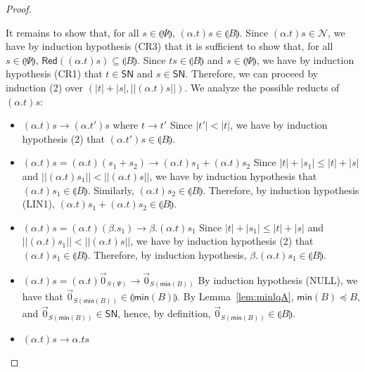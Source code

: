 \documentclass[preprint]{elsarticle}
\newcommand\interp[1]{\llparenthesis #1\rrparenthesis}
\newcommand\size[1]{||#1||}
\newcommand\Red[1]{\mathsf{Red}(#1)}
\newcommand\SN{\mathsf{SN}}
\newcommand\lpl[1]{|#1|}
\newcommand\z[1][A]{\vec 0_{S(#1)}}
\newcommand\nullvec[1]{\z[#1]}
\newcommand{\app}[2]{#1 #2}
\newcommand{\reducesto}{\rightarrow}
\begin{document}
\begin{proof}
\begin{itemize}
\begin{description}
         It remains to show that, for all \( s \in \interp{\Psi} \), \( \app{(\alpha . t)}{s} \in \interp{B} \). Since \( \app{(\alpha . t)}{s} \in \mathcal{N} \), we have by induction hypothesis (CR3) that it is sufficient to show that, for all \( s \in \interp{\Psi} \), \( \Red{\app{(\alpha . t)}{s}} \subseteq \interp{B} \). Since \( \app{t}{s} \in \interp{B} \) and \( s \in \interp{\Psi} \), we have by induction hypothesis (CR1) that \( t \in \SN \) and \( s \in \SN \). Therefore, we can proceed by induction (2) over \( (\lpl{t} + \lpl{s}, \size{\app{(\alpha . t)}{s}}) \). We analyze the possible reducts of \( \app{(\alpha . t)}{s} \):
        \begin{itemize}
          \item \( \app{(\alpha . t)}{s} \reducesto \app{(\alpha . t')}{s} \) where \( t \reducesto t' \)
           Since \( \lpl{t'} < \lpl{t} \), we have by induction hypothesis (2) that \( \app{(\alpha . t')}{s} \in \interp{B} \).
          \item \( \app{(\alpha . t)}{s} = \app{(\alpha . t)}{(s_1 + s_2)} \reducesto \app{(\alpha . t)}{s_1} + \app{(\alpha . t)}{s_2} \)
           Since \( \lpl{t} + \lpl{s_1} \leq \lpl{t} + \lpl{s} \) and \( \size{\app{(\alpha . t)}{s_1}} < \size{\app{(\alpha . t)}{s}} \), we have by induction hypothesis that \( \app{(\alpha . t)}{s_1} \in \interp{B} \). Similarly, \( \app{(\alpha . t)}{s_2} \in \interp{B} \). Therefore, by induction hypothesis (LIN1), \( \app{(\alpha . t)}{s_1} + \app{(\alpha . t)}{s_2} \in \interp{B} \).
          \item \( \app{(\alpha . t)}{s} = \app{(\alpha . t)}{(\beta . s_1)} \reducesto \beta . \app{(\alpha. t)}{s_1} \)
           Since \( \lpl{t} + \lpl{s_1} \leq \lpl{t} + \lpl{s} \) and \( \size{\app{(\alpha . t)}{s_1}} < \size{\app{(\alpha . t)}{s}} \), we have by induction hypothesis (2) that \( \app{(\alpha . t)}{s_1} \in \interp{B} \). Therefore, by induction hypothesis, \( \beta . \app{(\alpha . t)}{s_1} \in \interp{B} \).
          \item \( \app{(\alpha . t)}{s} = \app{(\alpha . t)}{\nullvec{\Psi}} \reducesto \nullvec{\mathsf{min}(B)} \)
             By induction hypothesis (NULL), we have that \( \nullvec{\mathsf{min}(B)} \in \interp{\mathsf{min}(B)} \).
             By Lemma~\ref{lem:minlqA},
             $\mathsf{min}(B)\preceq B$, and $\z[\mathsf{min}(B)]\in\SN$, hence,
             by definition, $\z[\mathsf{min}(B)]\in\interp B$.
          \item \( \app{(\alpha . t)}{s} \reducesto \alpha . \app{t}{s} \)

\end{itemize}
\end{description}
\end{itemize}
\end{proof}
\end{document}
